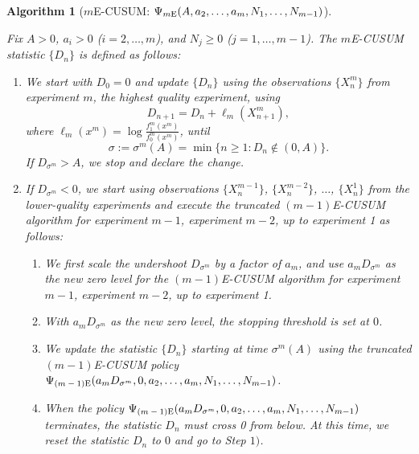 \documentclass[journal, onecolumn]{IEEEtran}
\newtheorem{algorithm}{Algorithm}
\begin{document}
\begin{algorithm}[$m$E-CUSUM: $\Psi_{\textup{$m$E}} (A, a_2, \dots, a_m, N_1, \dots, N_{m - 1})$]
\label{alg:me-cusum}

Fix $A > 0$, $a_i > 0$ ($i = 2, \dots, m$), and $N_j \geq 0$ ($j = 1, \dots, m - 1$). The \textup{$m$E-CUSUM statistic} $\{ D_n \}$ is defined as follows:

    \begin{enumerate}
    \item We start with $D_0 = 0$ and update $\{ D_n \}$ using the observations $\{ X_n^m \}$ from experiment $m$, the highest quality experiment, using
    $$ D_{n + 1}  = D_n + \ell_m (X_{n + 1}^m), $$
    where $\ell_m (x^m) = \log \frac{f_1^m (x^m)}{f_0^m (x^m)}$, until 
    $$ \sigma := \sigma^m (A) = \min \{ n \geq 1: D_n \notin (0, A) \}. $$
    If $D_{\sigma^m} > A$, we stop and declare the change.
    
    \item If $D_{\sigma^m} < 0$, we start using observations $\{ X_n^{m - 1} \}$, $\{ X_n^{m - 2} \}$, $\dots$, $\{ X_n^1 \}$ from the lower-quality experiments and execute the truncated \textup{$(m - 1)$E-CUSUM} algorithm for experiment $m - 1$, experiment $m - 2$, up to experiment 1 as follows:
    
    \begin{enumerate}
    \item We first scale the undershoot $D_{\sigma^m}$ by a factor of $a_m$, and use $a_m D_{\sigma^m}$ as the new zero level for the \textup{$(m - 1)$E-CUSUM} algorithm for experiment $m - 1$, experiment $m - 2$, up to experiment 1.
    
    \item With $a_m D_{\sigma^m}$ as the new zero level, the stopping threshold is set at $0$.
    
    \item We update the statistic $\{ D_n \}$ starting at time $\sigma^m (A)$ using the truncated $(m - 1)$\textup{E-CUSUM} policy \\ $\Psi_{\textup{$(m - 1)$E}} (a_m D_{\sigma^m}, 0, a_2, \dots, a_m, N_1, \dots, N_{m - 1})$.
    
    \item When the policy $\Psi_{\textup{$(m - 1)$E}} (a_m D_{\sigma^m}, 0, a_2, \dots, a_m, N_1, \dots, N_{m - 1})$ terminates, the statistic $D_n$ must cross 0 from below. At this time, we reset the statistic $D_n$ to $0$ and go to Step $1)$.
    \end{enumerate}
\end{enumerate}    
\end{algorithm}
\end{document}
